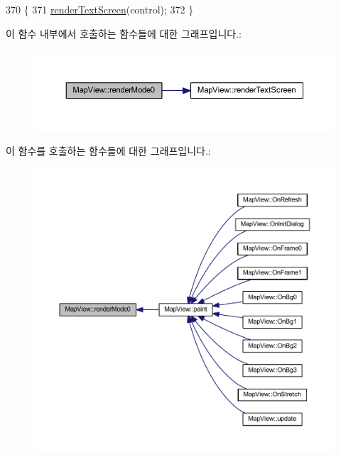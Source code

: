 \begin{DoxyCode}
370 \{
371   \mbox{\hyperlink{class_map_view_acff08c9c182f791799a27592ea7aafff}{renderTextScreen}}(control);
372 \}
\end{DoxyCode}
이 함수 내부에서 호출하는 함수들에 대한 그래프입니다.\+:
\nopagebreak
\begin{figure}[H]
\begin{center}
\leavevmode
\includegraphics[width=350pt]{class_map_view_a03250392fe23753257ed120df86aaea1_cgraph}
\end{center}
\end{figure}
이 함수를 호출하는 함수들에 대한 그래프입니다.\+:
\nopagebreak
\begin{figure}[H]
\begin{center}
\leavevmode
\includegraphics[width=350pt]{class_map_view_a03250392fe23753257ed120df86aaea1_icgraph}
\end{center}
\end{figure}
\mbox{\label{class_map_view_afcc44b85ee5727fc507a34672a3b6ce4}} 
